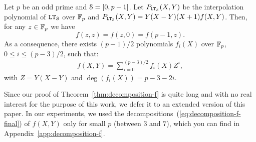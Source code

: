   \begin{theorem}\label{thm:decomposition-f}
    Let $p$ be an odd prime and $\S = [0,p-1]$.
    Let $P_{\LT_\S} (X, Y)$ be the interpolation polynomial of $\LT_\S$ over $\F_p$ and $P_{\LT_\S} (X, Y) = Y(X - Y)(X + 1)f(X, Y)$.
    Then, for any $z \in \F_p$ we have
    \begin{equation}
      \label{eq:3}
       f(z,z) = f(z,0) = f(p-1,z).
    \end{equation}
    As a consequence, 
    there exists $(p-1)/2$ polynomials $f_i(X)$ over $\F_p$, $0\leq i \leq (p-3)/2$, such that:
    \begin{align}\label{eq:decomposition-f-final}
      f(X,Y) = \sum_{i=0}^{(p-3)/2} f_i(X)Z^i,
    \end{align}
    with $Z=Y(X-Y)$ and $\deg (f_{i}(X)) = p-3 - 2i$.

  \end{theorem}  

  Since our proof of Theorem~\ref{thm:decomposition-f} is quite long and with no real interest for the purpose of this work, we defer it to an extended version of this paper. 
  In our experiments, we used the decompositions~(\ref{eq:decomposition-f-final}) of $f(X,Y)$ only for small $p$ (between $3$ and $7$), which you can find in Appendix~\ref{app:decomposition-f}.\newline
  



